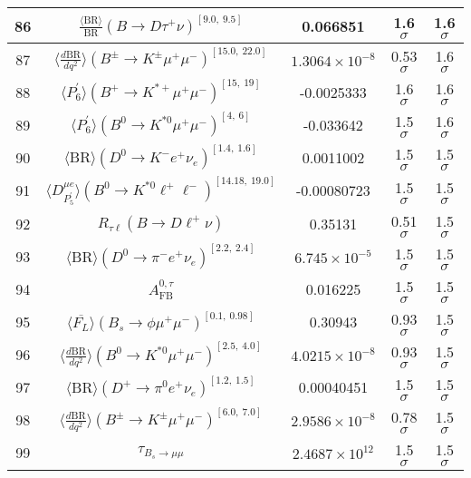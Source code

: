 \begin{longtable}{|c|c|c|c|c|}
86 &	 $\frac{\langle \mathrm{BR} \rangle}{\mathrm{BR}}(B\to D\tau^+\nu)^{[9.0,\  9.5]}$ &	 0.066851 &	 \cellcolor{green!0}1.6 $ \sigma$ &	 1.6 $ \sigma$ \\ \hline
87 &	 $\langle \frac{d\mathrm{BR}}{dq^2} \rangle(B^\pm\to K^\pm \mu^+\mu^-)^{[15.0,\  22.0]}$ &	 $1.3064\times 10^{-8}$ &	 \cellcolor{green!50}0.53 $ \sigma$ &	 1.6 $ \sigma$ \\ \hline
88 &	 $\langle P_6^\prime\rangle(B^+\to K^{\ast +}\mu^+\mu^-)^{[15,\  19]}$ &	 -0.0025333 &	 \cellcolor{green!0}1.6 $ \sigma$ &	 1.6 $ \sigma$ \\ \hline
89 &	 $\langle P_6^\prime\rangle(B^0\to K^{\ast 0}\mu^+\mu^-)^{[4,\  6]}$ &	 -0.033642 &	 \cellcolor{green!1}1.5 $ \sigma$ &	 1.6 $ \sigma$ \\ \hline
90 &	 $\langle\mathrm{BR}\rangle(D^0\to K^- e^+\nu_e)^{[1.4,\  1.6]}$ &	 0.0011002 &	 \cellcolor{green!0}1.5 $ \sigma$ &	 1.5 $ \sigma$ \\ \hline
91 &	 $\langle D_{P_5^\prime}^{\mu e} \rangle(B^0\to K^{\ast 0}\ell^+\ell^-)^{[14.18,\  19.0]}$ &	 -0.00080723 &	 \cellcolor{green!0}1.5 $ \sigma$ &	 1.5 $ \sigma$ \\ \hline
92 &	 $R_{\tau \ell}(B\to D\ell^+\nu)$ &	 0.35131 &	 \cellcolor{green!50}0.51 $ \sigma$ &	 1.5 $ \sigma$ \\ \hline
93 &	 $\langle\mathrm{BR}\rangle(D^0\to \pi^- e^+\nu_e)^{[2.2,\  2.4]}$ &	 $6.745\times 10^{-5}$ &	 \cellcolor{red!0}1.5 $ \sigma$ &	 1.5 $ \sigma$ \\ \hline
94 &	 $A_\mathrm{FB}^{0,\tau}$ &	 0.016225 &	 \cellcolor{green!0}1.5 $ \sigma$ &	 1.5 $ \sigma$ \\ \hline
95 &	 $\langle \overline{F_L}\rangle(B_s\to \phi \mu^+\mu^-)^{[0.1,\  0.98]}$ &	 0.30943 &	 \cellcolor{green!29}0.93 $ \sigma$ &	 1.5 $ \sigma$ \\ \hline
96 &	 $\langle \frac{d\mathrm{BR}}{dq^2} \rangle(B^0\to K^{\ast 0}\mu^+\mu^-)^{[2.5,\  4.0]}$ &	 $4.0215\times 10^{-8}$ &	 \cellcolor{green!28}0.93 $ \sigma$ &	 1.5 $ \sigma$ \\ \hline
97 &	 $\langle\mathrm{BR}\rangle(D^+\to \pi^0e^+\nu_e)^{[1.2,\  1.5]}$ &	 0.00040451 &	 \cellcolor{red!0}1.5 $ \sigma$ &	 1.5 $ \sigma$ \\ \hline
98 &	 $\langle \frac{d\mathrm{BR}}{dq^2} \rangle(B^\pm\to K^\pm \mu^+\mu^-)^{[6.0,\  7.0]}$ &	 $2.9586\times 10^{-8}$ &	 \cellcolor{green!35}0.78 $ \sigma$ &	 1.5 $ \sigma$ \\ \hline
99 &	 $\tau_{B_s \to \mu\mu}$ &	 $2.4687\times 10^{12}$ &	 \cellcolor{red!0}1.5 $ \sigma$ &	 1.5 $ \sigma$ \\ \hline

\end{longtable}
